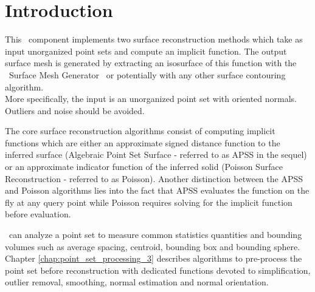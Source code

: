 \section{Introduction}

This \cgal\ component implements two surface reconstruction methods which take as input unorganized point sets and compute an implicit function. The output surface mesh is generated by extracting an isosurface of this function with the \cgal\ Surface Mesh Generator~\cite{cgal:ry-gsddrm-06} or potentially with any other surface contouring algorithm. \\
More specifically, the input is an unorganized point set with oriented normals. Outliers and noise should be avoided.

The core surface reconstruction algorithms consist of computing implicit functions which are either an approximate signed distance function to the inferred surface (Algebraic Point Set Surface - referred to as APSS in the sequel) or an approximate indicator function of the inferred solid (Poisson Surface Reconstruction - referred to as Poisson). Another distinction between the APSS and Poisson algorithms lies into the fact that APSS evaluates the function on the fly at any query point while Poisson requires solving for the implicit function before evaluation.

\cgal\ can analyze a point set to measure common statistics quantities and bounding volumes such as average spacing, centroid, bounding box and bounding sphere. Chapter  \ref{chap:point_set_processing_3} describes algorithms to pre-process the point set before reconstruction with dedicated functions devoted to simplification, outlier removal, smoothing, normal estimation and normal orientation.

